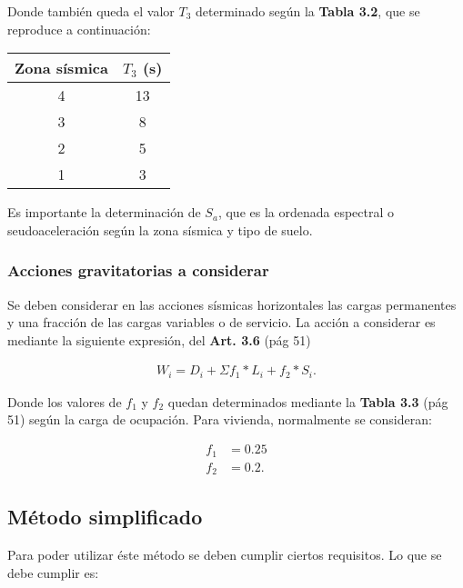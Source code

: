 \documentclass[../main.tex]{subfiles}
\begin{document}
 Donde también queda el valor $T_3$ determinado según la  \textbf{Tabla 3.2},
 que se reproduce a continuación:

\begin{center}
  \begin{tabular}{|c|c|}
    \hline
    \textbf{Zona sísmica} & $T_3$ (s) \\
    \hline
    4 & 13 \\
    \hline
    3 & 8 \\
    \hline
    2 & 5 \\
    \hline
    1 & 3 \\
    \hline
 \end{tabular} 
\end{center}

Es importante la determinación de $S_a$, que es la ordenada espectral o 
seudoaceleración según la zona sísmica y tipo de suelo.

\subsubsection{Acciones gravitatorias a considerar}

Se deben considerar en las acciones sísmicas horizontales las cargas permanentes
y una fracción de las cargas variables o de servicio. La acción a considerar
es mediante la siguiente expresión, del \textbf{Art. 3.6} (pág 51)

\begin{align*}
  W_i = D_i + \Sigma f_1 *L_i + f_2 * S_i
.\end{align*}

Donde los valores de $f_1$ y $f_2$ quedan determinados mediante la \textbf{Tabla 3.3}
(pág 51) según la carga de ocupación. Para vivienda, normalmente se consideran:

\begin{align*}
  f_1 &= 0.25 \\[5pt]
  f_2 &= 0.2
.\end{align*}




\subsection{Método simplificado}

Para poder utilizar éste método se deben cumplir ciertos requisitos. Lo que 
se debe cumplir es:
\end{document}
